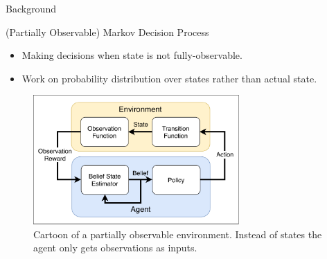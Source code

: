 \begin{exampleblock}{Background}
\begin{figure}[htp]
\end{figure}


\Large{(Partially Observable) Markov Decision Process}
\normalsize
\begin{itemize}
    \item Making decisions when state is not fully-observable.
    \item Work on probability distribution over states rather than actual state.
\end{itemize}
\begin{figure}
  \centering
    \includegraphics[width=0.7\textwidth]{img/background/POMDP}
  \caption{Cartoon of a partially observable environment. Instead of states the agent only gets observations as inputs.}
\end{figure}






\end{exampleblock}
